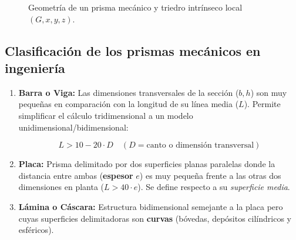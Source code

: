\begin{figure}[H]
{%

    }

    \caption{Geometría de un prisma mecánico y triedro intrínseco local $(G, x, y, z)$.}

    \label{fig:prisma_mecanico_triedro}

\end{figure}



\subsection{Clasificación de los prismas mecánicos en ingeniería}

\begin{enumerate}

    \item \textbf{Barra o Viga:} Las dimensiones transversales de la sección ($b, h$) son muy pequeñas en comparación con la longitud de su línea media ($L$). Permite simplificar el cálculo tridimensional a un modelo unidimensional/bidimensional:

          \begin{equation}

              L > 10 - 20 \cdot D \quad (D = \text{canto o dimensión transversal})

          \end{equation}

    \item \textbf{Placa:} Prisma delimitado por dos superficies planas paralelas donde la distancia entre ambas (\textbf{espesor} $e$) es muy pequeña frente a las otras dos dimensiones en planta ($L > 40\cdot e$). Se define respecto a su \textit{superficie media}.

    \item \textbf{Lámina o Cáscara:} Estructura bidimensional semejante a la placa pero cuyas superficies delimitadoras son \textbf{curvas} (bóvedas, depósitos cilíndricos y esféricos).

\end{enumerate}



